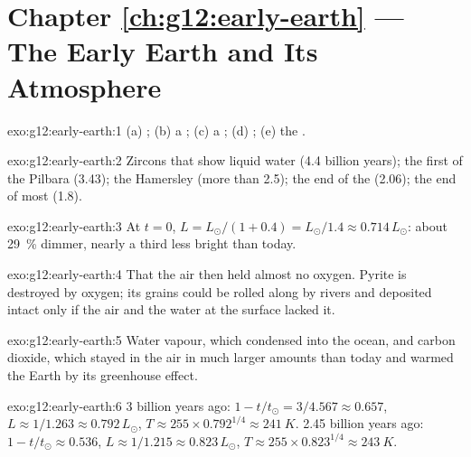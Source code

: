 \section*{Chapter \ref{ch:g12:early-earth} --- The Early Earth and Its Atmosphere}

\begin{solution}{exo:g12:early-earth:1}
(a) ; (b) a ; (c) a ; (d) ; (e) the .
\end{solution}

\begin{solution}{exo:g12:early-earth:2}
Zircons that show liquid water (4.4 billion years); the first 
of the Pilbara (3.43); the Hamersley  (more than
2.5); the end of the  (2.06); the end of most  (1.8).
\end{solution}

\begin{solution}{exo:g12:early-earth:3}
At $t = 0$, $L = L_\odot/(1 + 0.4) = L_\odot/1.4 \approx 0.714\,L_\odot$:
about \qty{29}{\percent} dimmer, nearly a third less bright than today.
\end{solution}

\begin{solution}{exo:g12:early-earth:4}
That the air then held almost no oxygen. Pyrite is destroyed by oxygen;
its grains could be rolled along by rivers and deposited intact only if the
air and the water at the surface lacked it.
\end{solution}

\begin{solution}{exo:g12:early-earth:5}
Water vapour, which condensed into the ocean, and carbon dioxide, which
stayed in the air in much larger amounts than today and warmed the Earth by
its greenhouse effect.
\end{solution}

\begin{solution}{exo:g12:early-earth:6}
3 billion years ago: $1 - t/t_\odot = 3/4.567 \approx 0.657$, $L \approx
1/1.263 \approx 0.792\,L_\odot$, $T \approx 255 \times 0.792^{1/4} \approx
\qty{241}{K}$. 2.45 billion years ago: $1 - t/t_\odot \approx 0.536$, $L
\approx 1/1.215 \approx 0.823\,L_\odot$, $T \approx 255 \times 0.823^{1/4}
\approx \qty{243}{K}$.
\end{solution}

